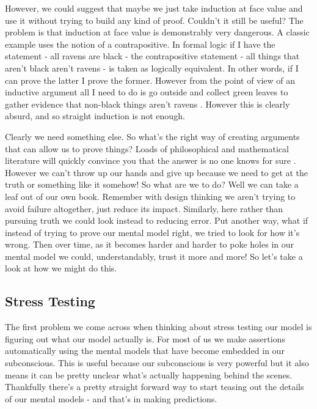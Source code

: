 \documentclass[11pt,a5paper]{book}
\begin{document}
However, we could suggest that maybe we just take induction at face value and use it without trying to build any kind of proof. Couldn't it still be useful? The problem is that induction at face value is demonstrably very dangerous. A classic example uses the notion of a contrapositive. In formal logic if I have the statement - all ravens are black - the contrapositive statement - all things that aren't black aren't ravens - is taken as logically equivalent. In other words, if I can prove the latter I prove the former. However from the point of view of an inductive argument all I need to do is go outside and collect green leaves to gather evidence that non-black things aren't ravens \cite{lipton}. However this is clearly absurd, and so straight induction is not enough. 
\newline

Clearly we need something else. So what's the right way of creating arguments that can allow us to prove things? Loads of philosophical and mathematical literature will quickly convince you that the answer is no one knows for sure \cite{lipton} \cite{tkuhn}. However we can't throw up our hands and give up because we need to get at the truth or something like it somehow! So what are we to do? Well we can take a leaf out of our own book. Remember with design thinking we aren't trying to avoid failure altogether, just reduce its impact. Similarly, here rather than pursuing truth we could look instead to reducing error. Put another way, what if instead of trying to prove our mental model right, we tried to look for how it's wrong. Then over time, as it becomes harder and harder to poke holes in our mental model we could, understandably, trust it more and more! So let's take a look at how we might do this. 

\subsection{Stress Testing}
The first problem we come across when thinking about stress testing our model is figuring out what our model actually is. For most of us we make assertions automatically using the mental models that have become embedded in our subconscious. This is useful because our subconscious is very powerful \cite{newport} but it also means it can be pretty unclear what's actually happening behind the scenes. Thankfully there's a pretty straight forward way to start teasing out the details of our mental models - and that's in making predictions. 
\newline
\end{document}
